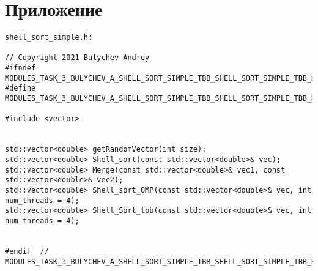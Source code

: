 \documentclass{report}
\begin{document}
\section*{Приложение}
\begin{lstlisting}
shell_sort_simple.h:

// Copyright 2021 Bulychev Andrey
#ifndef MODULES_TASK_3_BULYCHEV_A_SHELL_SORT_SIMPLE_TBB_SHELL_SORT_SIMPLE_TBB_H_
#define MODULES_TASK_3_BULYCHEV_A_SHELL_SORT_SIMPLE_TBB_SHELL_SORT_SIMPLE_TBB_H_

#include <vector>


std::vector<double> getRandomVector(int size);
std::vector<double> Shell_sort(const std::vector<double>& vec);
std::vector<double> Merge(const std::vector<double>& vec1, const std::vector<double>& vec2);
std::vector<double> Shell_sort_OMP(const std::vector<double>& vec, int num_threads = 4);
std::vector<double> Shell_Sort_tbb(const std::vector<double>& vec, int num_threads = 4);


#endif  // MODULES_TASK_3_BULYCHEV_A_SHELL_SORT_SIMPLE_TBB_SHELL_SORT_SIMPLE_TBB_H_

\end{lstlisting}
\end{document}
